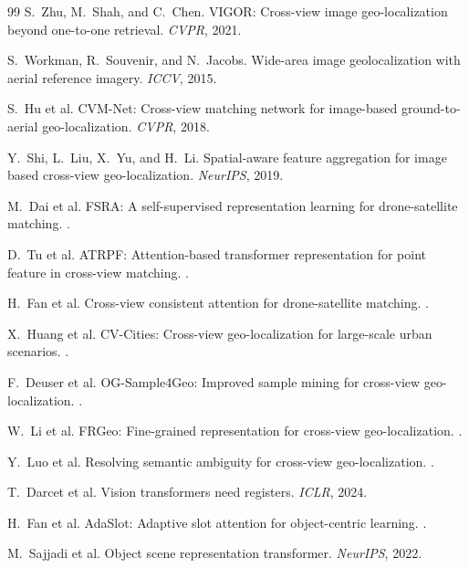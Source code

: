 \documentclass{article}
\begin{document}
{\begin{thebibliography}{99}
S.~Zhu, M.~Shah, and C.~Chen.
\newblock VIGOR: Cross-view image geo-localization beyond one-to-one retrieval.
\newblock \emph{CVPR}, 2021.

S.~Workman, R.~Souvenir, and N.~Jacobs.
\newblock Wide-area image geolocalization with aerial reference imagery.
\newblock \emph{ICCV}, 2015.

S.~Hu et al.
\newblock CVM-Net: Cross-view matching network for image-based ground-to-aerial geo-localization.
\newblock \emph{CVPR}, 2018.

Y.~Shi, L.~Liu, X.~Yu, and H.~Li.
\newblock Spatial-aware feature aggregation for image based cross-view geo-localization.
\newblock \emph{NeurIPS}, 2019.

M.~Dai et al.
\newblock FSRA: A self-supervised representation learning for drone-satellite matching.
.

D.~Tu et al.
\newblock ATRPF: Attention-based transformer representation for point feature in cross-view matching.
.

H.~Fan et al.
\newblock Cross-view consistent attention for drone-satellite matching.
.

X.~Huang et al.
\newblock CV-Cities: Cross-view geo-localization for large-scale urban scenarios.
.

F.~Deuser et al.
\newblock OG-Sample4Geo: Improved sample mining for cross-view geo-localization.
.

W.~Li et al.
\newblock FRGeo: Fine-grained representation for cross-view geo-localization.
.

Y.~Luo et al.
\newblock Resolving semantic ambiguity for cross-view geo-localization.
.

T.~Darcet et al.
\newblock Vision transformers need registers.
\newblock \emph{ICLR}, 2024.

H.~Fan et al.
\newblock AdaSlot: Adaptive slot attention for object-centric learning.
.

M.~Sajjadi et al.
\newblock Object scene representation transformer.
\newblock \emph{NeurIPS}, 2022.


\end{thebibliography}}
\end{document}
